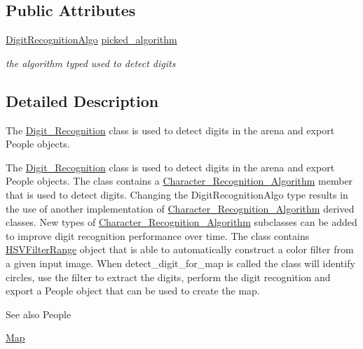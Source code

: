 \subsection*{Public Attributes}
\begin{DoxyCompactItemize}
\item 
\mbox{\label{class_image_processing_1_1_digit___recognition_abd6b1ab006d68a0f7b2ae3acc11d2a23}} 
\mbox{\hyperlink{namespace_image_processing_afe66b5cb462eb22dcf108308418c09eb}{Digit\+Recognition\+Algo}} \mbox{\hyperlink{class_image_processing_1_1_digit___recognition_abd6b1ab006d68a0f7b2ae3acc11d2a23}{picked\+\_\+algorithm}}
\begin{DoxyCompactList}\small\item\em the algorithm typed used to detect digits \end{DoxyCompactList}\end{DoxyCompactItemize}


\subsection{Detailed Description}
The \mbox{\hyperlink{class_image_processing_1_1_digit___recognition}{Digit\+\_\+\+Recognition}} class is used to detect digits in the arena and export People objects. 

The \mbox{\hyperlink{class_image_processing_1_1_digit___recognition}{Digit\+\_\+\+Recognition}} class is used to detect digits in the arena and export People objects. The class contains a \mbox{\hyperlink{class_image_processing_1_1_character___recognition___algorithm}{Character\+\_\+\+Recognition\+\_\+\+Algorithm}} member that is used to detect digits. Changing the Digit\+Recognition\+Algo type results in the use of another implementation of \mbox{\hyperlink{class_image_processing_1_1_character___recognition___algorithm}{Character\+\_\+\+Recognition\+\_\+\+Algorithm}} derived classes. New types of \mbox{\hyperlink{class_image_processing_1_1_character___recognition___algorithm}{Character\+\_\+\+Recognition\+\_\+\+Algorithm}} subclasses can be added to improve digit recognition performance over time. The class contains \mbox{\hyperlink{struct_image_processing_1_1_h_s_v_filter_range}{H\+S\+V\+Filter\+Range}} object that is able to automatically construct a color filter from a given input image. When detect\+\_\+digit\+\_\+for\+\_\+map is called the class will identify circles, use the filter to extract the digits, perform the digit recognition and export a People object that can be used to create the map. \begin{DoxySeeAlso}{See also}
People 

\mbox{\hyperlink{class_map}{Map}} 
\end{DoxySeeAlso}


